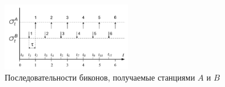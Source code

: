 %
%
%
%
%


% 











% 






\begin{figure}[!h]
\begin{center}
 \includegraphics[width=0.5\textwidth]{pic/sigmaABrus.pdf}
\end{center}
\caption{\label{pic:SigmaAB} Последовательности биконов, получаемые станциями $A$ и $B$}
\end{figure}

